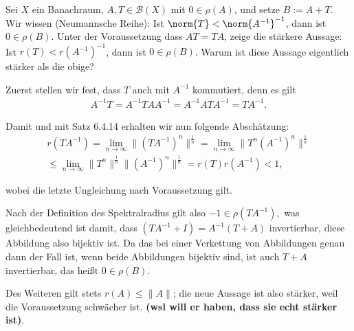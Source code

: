 \begin{exercise}[22/1]

Sei $X$ ein Banachraum, $A, T \in \mathcal{B}(X)$ mit $0 \in \rho(A)$, und setze $B := A + T$.
Wir wissen (Neumannsche Reihe):
Ist $\norm{T} < \norm{A^{-1}}^{-1}$, dann ist $0 \in \rho(B)$.
Unter der Voraussetzung dass $A T = T A$, zeige die stärkere Aussage:
Ist $r(T) < r(A^{-1})^{-1}$, dann ist $0 \in \rho(B)$.
Warum ist diese Aussage eigentlich stärker als die obige?

\end{exercise}

\begin{solution}
  Zuerst stellen wir fest, dass $T$ auch mit $A^{-1}$ kommutiert, denn es gilt
  \begin{align}
      A^{-1}T = A^{-1}TAA^{-1} = A^{-1}ATA^{-1} = TA^{-1}.
  \end{align}

  Damit und mit Satz 6.4.14 erhalten wir nun folgende Abschätzung:
  \begin{align}
      r(TA^{-1}) = \lim\limits_{n \rightarrow \infty}{\|(TA^{-1})^n\|^{\frac{1}{n}}} =
      \lim\limits_{n \rightarrow \infty}{\|T^n(A^{-1})^n\|^{\frac{1}{n}}} \\ \leq
      \lim\limits_{n \rightarrow \infty}{\|T^n\|^{\frac{1}{n}}\|(A^{-1})^n\|^{\frac{1}{n}}} =
      r(T) r(A^{-1}) < 1,
  \end{align}

  wobei die letzte Ungleichung nach Voraussetzung gilt.

  Nach der Definition des Spektralradius gilt also $-1 \in \rho(TA^{-1}),$ was gleichbedeutend ist damit, dass $(TA^{-1} + I) = A^{-1} (T + A)$ invertierbar, diese Abbildung also bijektiv ist.
  Da das bei einer Verkettung von Abbildungen genau dann der Fall ist, wenn beide Abbildungen bijektiv sind, ist auch $T + A$ invertierbar, das heißt $0 \in \rho(B).$


  Des Weiteren gilt stets $r(A) \leq \|A\|$; die neue Aussage ist also stärker, weil die Voraussetzung schwächer ist. \textbf{(wsl will er haben, dass sie echt stärker ist)}.
\end{solution}
